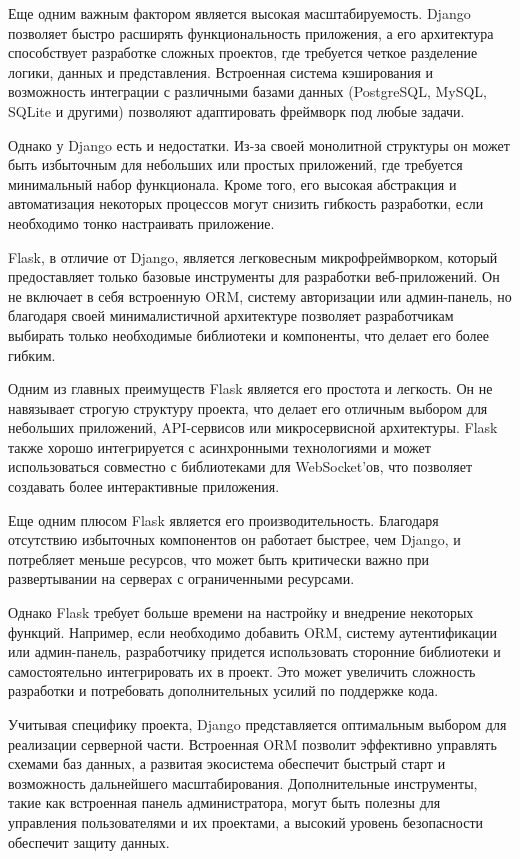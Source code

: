 Еще одним важным фактором является высокая масштабируемость. Django позволяет быстро расширять функциональность приложения, а его архитектура способствует разработке сложных проектов, где требуется четкое разделение логики, данных и представления. Встроенная система кэширования и возможность интеграции с различными базами данных (PostgreSQL, MySQL, SQLite и другими) позволяют адаптировать фреймворк под любые задачи.

Однако у Django есть и недостатки. Из-за своей монолитной структуры он может быть избыточным для небольших или простых приложений, где требуется минимальный набор функционала. Кроме того, его высокая абстракция и автоматизация некоторых процессов могут снизить гибкость разработки, если необходимо тонко настраивать приложение.

Flask, в отличие от Django, является легковесным микрофреймворком, который предоставляет только базовые инструменты для разработки веб-приложений. Он не включает в себя встроенную ORM, систему авторизации или админ-панель, но благодаря своей минималистичной архитектуре позволяет разработчикам выбирать только необходимые библиотеки и компоненты, что делает его более гибким.

Одним из главных преимуществ Flask является его простота и легкость. Он не навязывает строгую структуру проекта, что делает его отличным выбором для небольших приложений, API-сервисов или микросервисной архитектуры. Flask также хорошо интегрируется с асинхронными технологиями и может использоваться совместно с библиотеками для WebSocket’ов, что позволяет создавать более интерактивные приложения.

Еще одним плюсом Flask является его производительность. Благодаря отсутствию избыточных компонентов он работает быстрее, чем Django, и потребляет меньше ресурсов, что может быть критически важно при развертывании на серверах с ограниченными ресурсами.

Однако Flask требует больше времени на настройку и внедрение некоторых функций. Например, если необходимо добавить ORM, систему аутентификации или админ-панель, разработчику придется использовать сторонние библиотеки и самостоятельно интегрировать их в проект. Это может увеличить сложность разработки и потребовать дополнительных усилий по поддержке кода.

Учитывая специфику проекта, Django представляется оптимальным выбором для реализации серверной части. Встроенная ORM позволит эффективно управлять схемами баз данных, а развитая экосистема обеспечит быстрый старт и возможность дальнейшего масштабирования. Дополнительные инструменты, такие как встроенная панель администратора, могут быть полезны для управления пользователями и их проектами, а высокий уровень безопасности обеспечит защиту данных.

